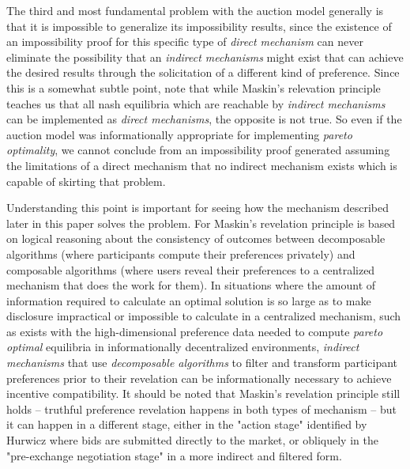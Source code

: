 \documentclass[sigconf,anonymous]{aamas}
\begin{document}
The third and most fundamental problem with the auction model generally is that it is impossible to generalize its impossibility results, since the existence of an impossibility proof for this specific type of \textit{direct mechanism} can never eliminate the possibility that an \textit{indirect mechanisms} might exist that can achieve the desired results through the solicitation of a different kind of preference. Since this is a somewhat subtle point, note that while Maskin's relevation principle teaches us that all nash equilibria which are reachable by \textit{indirect mechanisms} can be implemented as \textit{direct mechanisms}, the opposite is not true. So even if the auction model was informationally appropriate for implementing \textit{pareto optimality}, we cannot conclude from an impossibility proof generated assuming the limitations of a direct mechanism that no indirect mechanism exists which is capable of skirting that problem.

Understanding this point is important for seeing how the mechanism described later in this paper solves the problem. For Maskin's revelation principle is based on logical reasoning about the consistency of outcomes between decomposable algorithms (where participants compute their preferences privately) and composable algorithms (where users reveal their preferences to a centralized mechanism that does the work for them). In situations where the amount of information required to calculate an optimal solution is so large as to make disclosure impractical or impossible to calculate in a centralized mechanism, such as exists with the high-dimensional preference data needed to compute \textit{pareto optimal} equilibria in informationally decentralized environments, \textit{indirect mechanisms} that use \textit{decomposable algorithms} to filter and transform participant preferences prior to their revelation can be informationally necessary to achieve incentive compatibility. It should be noted that Maskin's revelation principle still holds -- truthful preference revelation happens in both types of mechanism -- but it can happen in a different stage, either in the "action stage" identified by Hurwicz where bids are submitted directly to the market, or obliquely in the "pre-exchange negotiation stage" in a more indirect and filtered form.
\end{document}
